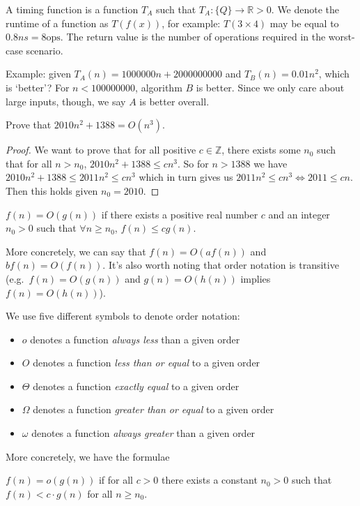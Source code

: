 \documentclass[12pt]{article}
\begin{document}
A timing function is a function $T_A$ such that $T_A : \{Q\} \to \mathbb{R} > 0$. We denote the runtime of a function as $T(f(x))$, for example: $T(3 \times 4)$ may be equal to $0.8ns = 8\text{ops}$. The return value is the number of operations required in the worst-case scenario.

Example: given $T_A(n) = 1 000 000n + 2 000 000 000$ and $T_B(n) = 0.01n^2$, which is `better'? For $n < 100 000 000$, algorithm $B$ is better. Since we only care about large inputs, though, we say $A$ is better overall.

\begin{example}
Prove that $2010n^2 + 1388 = O(n^3)$.

\begin{proof}
We want to prove that for all positive $c \in \mathbb{Z}$, there exists some $n_0$ such that for all $n > n_0$, $2010 n^2 + 1388 \leq cn^3$. So for $n > 1388$ we have $2010n^2 + 1388 \leq 2011n^2 \leq cn^3$ which in turn gives us $2011n^2 \leq cn^3 \iff 2011 \leq cn$. Then this holds given $n_0 = 2010$.
\end{proof}
\end{example}

\begin{definition}
$f(n) = O(g(n))$ if there exists a positive real number $c$ and an integer $n_0 > 0$ such that $\forall n \geq n_0$, $f(n) \leq cg(n)$.
\end{definition}

More concretely, we can say that $f(n) = O(af(n))$ and $b f(n) = O(f(n))$. It's also worth noting that order notation is transitive (e.g.\ $f(n) = O(g(n))$ and $g(n) = O(h(n))$ implies $f(n) = O(h(n))$).

We use five different symbols to denote order notation:
\begin{itemize}
\item $o$ denotes a function \emph{always less} than a given order
\item $O$ denotes a function \emph{less than or equal} to a given order
\item $\Theta$ denotes a function \emph{exactly equal} to a given order
\item $\Omega$ denotes a function \emph{greater than or equal} to a given order
\item $\omega$ denotes a function \emph{always greater} than a given order
\end{itemize}

More concretely, we have the formulae
\begin{definition}[$o$]
$f(n) = o(g(n))$ if for all $c > 0$ there exists a constant $n_0 > 0$ such that $f(n) < c \cdot g(n)$ for all $n \geq n_0$.
\end{definition}
\end{document}
